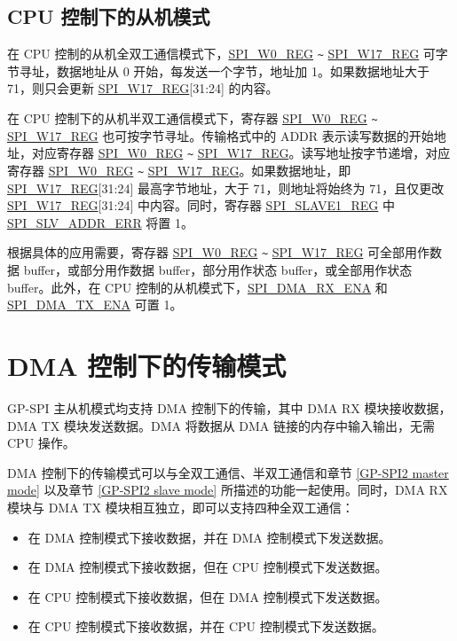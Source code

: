 \documentclass[main\_\_CN.tex]{subfiles}
\begin{document}
\subsection{CPU 控制下的从机模式} \label{GP-SPI2 slave CPU}

在 CPU 控制的从机全双工通信模式下，\hyperref[regdesc:SPIW0REG]{SPI\_W0\_REG} \verb+~+ \hyperref[regdesc:SPIW17REG]{SPI\_W17\_REG} 可字节寻址，数据地址从 0 开始，每发送一个字节，地址加 1。如果数据地址大于 71，则只会更新 \hyperref[regdesc:SPIW17REG]{SPI\_W17\_REG}[31:24] 的内容。

在 CPU 控制下的从机半双工通信模式下，寄存器 \hyperref[regdesc:SPIW0REG]{SPI\_W0\_REG} \verb+~+ \hyperref[regdesc:SPIW17REG]{SPI\_W17\_REG} 也可按字节寻址。传输格式中的 ADDR 表示读写数据的开始地址，对应寄存器 \hyperref[regdesc:SPIW0REG]{SPI\_W0\_REG}  \verb+~+ \hyperref[regdesc:SPIW17REG]{SPI\_W17\_REG}。读写地址按字节递增，对应 寄存器 \hyperref[regdesc:SPIW0REG]{SPI\_W0\_REG} \verb+~+ \hyperref[regdesc:SPIW17REG]{SPI\_W17\_REG}。如果数据地址，即 \hyperref[regdesc:SPIW17REG]{SPI\_W17\_REG}[31:24] 最高字节地址，大于 71，则地址将始终为 71，且仅更改 \hyperref[regdesc:SPIW17REG]{SPI\_W17\_REG}[31:24] 中内容。同时，寄存器 \hyperref[regdesc:SPISLAVE1REG]{SPI\_SLAVE1\_REG} 中 \hyperref[fielddesc:SPISLVADDRERR]{SPI\_SLV\_ADDR\_ERR} 将置 1。

根据具体的应用需要，寄存器 \hyperref[regdesc:SPIW0REG]{SPI\_W0\_REG} \verb+~+ \hyperref[regdesc:SPIW17REG]{SPI\_W17\_REG} 可全部用作数据 buffer，或部分用作数据 buffer，部分用作状态 buffer，或全部用作状态 buffer。此外，在 CPU 控制的从机模式下，\hyperref[fielddesc:SPIDMARXENA]{SPI\_DMA\_RX\_ENA} 和 \hyperref[fielddesc:SPIDMATXENA]{SPI\_DMA\_TX\_ENA} 可置 1。


\section{DMA 控制下的传输模式}\label{Subsection:Usage of GP-SPI2 DMA controlled mode}

GP-SPI 主从机模式均支持 DMA 控制下的传输，其中 DMA RX 模块接收数据，DMA TX 模块发送数据。DMA 将数据从 DMA 链接的内存中输入输出，无需 CPU 操作。

DMA 控制下的传输模式可以与全双工通信、半双工通信和章节 \ref{GP-SPI2 master mode} 以及章节  \ref{GP-SPI2 slave mode} 所描述的功能一起使用。同时，DMA RX 模块与 DMA TX 模块相互独立，即可以支持四种全双工通信：

\begin{itemize}
    \item 在 DMA 控制模式下接收数据，并在 DMA 控制模式下发送数据。

    \item 在 DMA 控制模式下接收数据，但在 CPU 控制模式下发送数据。

    \item 在 CPU 控制模式下接收数据，但在 DMA 控制模式下发送数据。

    \item 在 CPU 控制模式下接收数据，并在 CPU 控制模式下发送数据。

\end{itemize}
\end{document}
